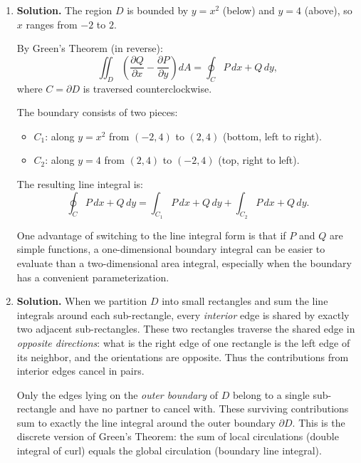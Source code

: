 \begin{enumerate}
\item \textbf{Solution.}
The region $D$ is bounded by $y = x^2$ (below) and $y=4$ (above), so $x$ ranges from $-2$ to $2$.

By Green's Theorem (in reverse):
\[
\iint_D\left(\frac{\partial Q}{\partial x}-\frac{\partial P}{\partial y}\right)dA = \oint_C P\,dx + Q\,dy,
\]
where $C = \partial D$ is traversed counterclockwise.

The boundary consists of two pieces:
\begin{itemize}
\item $C_1$: along $y = x^2$ from $(-2,4)$ to $(2,4)$ (bottom, left to right).
\item $C_2$: along $y = 4$ from $(2,4)$ to $(-2,4)$ (top, right to left).
\end{itemize}

The resulting line integral is:
\[
\oint_C P\,dx + Q\,dy = \int_{C_1} P\,dx + Q\,dy + \int_{C_2} P\,dx + Q\,dy.
\]

One advantage of switching to the line integral form is that if $P$ and $Q$ are simple functions, a one-dimensional boundary integral can be easier to evaluate than a two-dimensional area integral, especially when the boundary has a convenient parameterization.

\item \textbf{Solution.}
When we partition $D$ into small rectangles and sum the line integrals around each sub-rectangle, every \emph{interior} edge is shared by exactly two adjacent sub-rectangles. These two rectangles traverse the shared edge in \emph{opposite directions}: what is the right edge of one rectangle is the left edge of its neighbor, and the orientations are opposite. Thus the contributions from interior edges cancel in pairs.

Only the edges lying on the \emph{outer boundary} of $D$ belong to a single sub-rectangle and have no partner to cancel with. These surviving contributions sum to exactly the line integral around the outer boundary $\partial D$. This is the discrete version of Green's Theorem: the sum of local circulations (double integral of curl) equals the global circulation (boundary line integral).


\end{enumerate}

